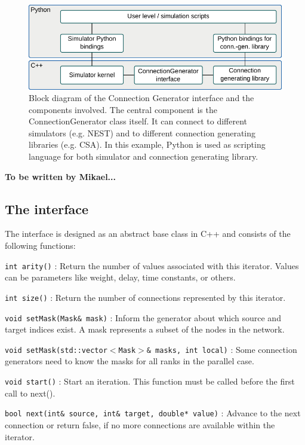 \documentclass{frontiersSCNS} %
\newcommand{\tbw}[1]{{\bf\parindent0pt\color{red}#1}}
\begin{document}
\begin{figure}[ht]
\centering
\includegraphics[scale=.8]{figures/block_diagram_conngen.pdf}
\caption{Block diagram of the Connection Generator interface and the
  components involved. The central component is the
  ConnectionGenerator class itself. It can connect to different simulators
  (e.g. NEST) and to different connection generating libraries
  (e.g. CSA). In this example, Python is used as scripting language
  for both simulator and connection generating
  library.}\label{fig:block_diagram_conngen}
\end{figure}

\tbw{To be written by Mikael...}

\subsection{The interface}\label{sec:cgint}

The interface is designed as an abstract base class in C++ and
consists of the following functions:

\begin{unlist}
\item[\tt int arity()]: Return the number of values associated with this
  iterator. Values can be parameters like weight, delay, time
  constants, or others.
\item[\tt int size()]: Return the number of connections represented by
  this iterator.
\item[\tt void setMask(Mask\& mask)]: Inform the generator about which
  source and target indices exist. A mask represents a subset of the
  nodes in the network.
\item[\tt void setMask(std::vector$<$Mask$>$\& masks, int local)]: Some
  connection generators need to know the masks for all ranks in the
  parallel case.
\item[\tt void start()]: Start an iteration. This function must be called
  before the first call to next().
\item[\tt bool next(int\& source, int\& target, double* value)]: Advance
  to the next connection or return false, if no more connections are
  available within the iterator.
\end{unlist}
\end{document}
